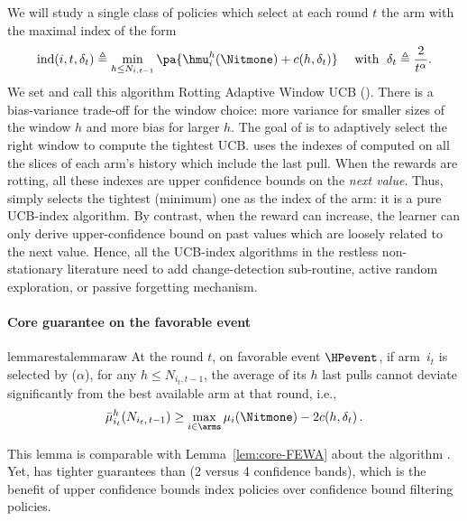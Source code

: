 We will study a single class of policies which select at each round $t$ the arm with the maximal index of the form
\begin{align}
\label{eq:raw_index}
\operatorname{ind}(i,t, \delta_{t}) \triangleq \min_{h\leq N_{i,t-1}}\pa{ {\hmu}_i^h(\Nitmone) + c(h,\delta_{t})}\quad \text{ with } \; \delta_{t} \triangleq \frac{2}{t^\alpha} .
\end{align}
We set and call this algorithm Rotting Adaptive Window UCB (\RUCB). There is a bias-variance trade-off for the window choice: more variance for smaller sizes of the window $h$ and more bias for larger $h$. The goal of \RUCB is to adaptively select the right window to compute the tightest UCB. \RUCB uses the indexes of \UCBone computed on all the slices of each arm's history which include the last pull. When the rewards are rotting, all these indexes are upper confidence bounds on the \textit{next value}.  Thus, \RUCB simply selects the tightest (minimum) one as the index of the arm: it is a pure UCB-index algorithm. By contrast, when the reward can increase, the learner can only derive upper-confidence bound on past values which are loosely related to the next value. Hence, all the UCB-index algorithms in the restless non-stationary literature need to add change-detection sub-routine, active random exploration, or passive forgetting mechanism. 

\paragraph{Core guarantee on the favorable event}

\begin{restatable}{lemma}{restalemmaraw}
\label{lem:core-RAWUCB}
At the round $t$, on favorable event $\HPevent$, if arm~$i_{t}$ is selected by \RUCB($\alpha$), for any $h \leq N_{i_t,t-1}$,  the average of its $h$ last pulls cannot deviate significantly from the best available arm at that round, i.e.,
%
\begin{equation*}
\bar{\mu}_{i_t}^{h}(N_{i_t,\, t-1}) \geq \max_{i \in \arms} \mu_{i}(\Nitmone) - 2 c(h, \delta_t)\,.
\end{equation*}
\end{restatable}
This lemma is comparable with Lemma~\ref{lem:core-FEWA} about the algorithm \FEWA. Yet, \RUCB has tighter guarantees than \FEWA (2 versus 4 confidence bands), which is the benefit of upper confidence bounds index policies over confidence bound filtering policies. 

